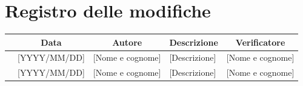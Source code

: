 \documentclass[11pt, a4paper]{article}
\begin{document}
\section{Registro delle modifiche}
\begin{center}
    \renewcommand{\arraystretch}{1.5}
    \begin{tabularx}{\textwidth}{|c|c|c|X|c|}
        \hline
        \rowcolor{gray!20} 
        \multicolumn{1}{|c|}{\textbf{Versione}} & 
        \multicolumn{1}{c|}{\textbf{Data}} & 
        \multicolumn{1}{c|}{\textbf{Autore}} & 
        \multicolumn{1}{c|}{\textbf{Descrizione}} & 
        \multicolumn{1}{c|}{\textbf{Verificatore}} \\
        \hline
        [1.X.X] & [YYYY/MM/DD] & [Nome e cognome] & [Descrizione] & [Nome e cognome] \\
        \hline
        [0.1.0] & [YYYY/MM/DD] & [Nome e cognome] & [Descrizione] & [Nome e cognome] \\
        \hline
        
    \end{tabularx}
\end{center}
\end{document}

